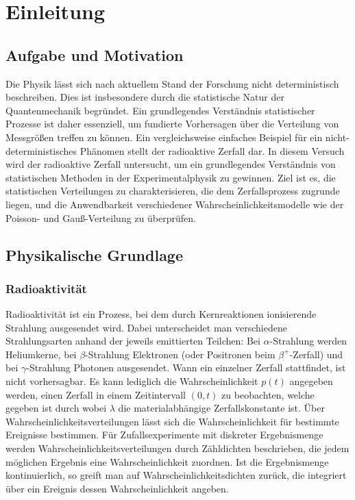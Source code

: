\chapter{Einleitung} \label{ch:Einleitung}

\section{Aufgabe und Motivation}
\label{sec:AuM}

Die Physik lässt sich nach aktuellem Stand der Forschung nicht deterministisch beschreiben. Dies ist insbesondere durch die statistische Natur der Quantenmechanik begründet. Ein grundlegendes Verständnis statistischer Prozesse ist daher essenziell, um fundierte Vorhersagen über die Verteilung von Messgrößen treffen zu können. Ein vergleichsweise einfaches Beispiel für ein nicht-deterministisches Phänomen stellt der radioaktive Zerfall dar.
In diesem Versuch wird der radioaktive Zerfall untersucht, um ein grundlegendes Verständnis von statistischen Methoden in der Experimentalphysik zu gewinnen. Ziel ist es, die statistischen Verteilungen zu charakterisieren, die dem Zerfallsprozess zugrunde liegen, und die Anwendbarkeit verschiedener Wahrscheinlichkeitsmodelle wie der Poisson- und Gauß-Verteilung zu überprüfen.

\section{Physikalische Grundlage}
\label{sec:PhyBasics}
\subsection{Radioaktivität}
Radioaktivität ist ein Prozess, bei dem durch Kernreaktionen ionisierende Strahlung ausgesendet wird. Dabei unterscheidet man verschiedene Strahlungsarten anhand der jeweils emittierten Teilchen: Bei $\alpha$-Strahlung werden Heliumkerne, bei $\beta$-Strahlung Elektronen (oder Positronen beim $\beta^+$-Zerfall) und bei $\gamma$-Strahlung Photonen ausgesendet. Wann ein einzelner Zerfall stattfindet, ist nicht vorhersagbar. Es kann lediglich die Wahrscheinlichkeit $p(t)$ angegeben werden, einen Zerfall in einem Zeitintervall $(0,t)$ zu beobachten, welche gegeben ist durch
wobei $\lambda$ die materialabhängige Zerfallskonstante ist.
Über Wahrscheinlichkeitsverteilungen lässt sich die Wahrscheinlichkeit für bestimmte Ereignisse bestimmen. Für Zufallsexperimente mit diskreter Ergebnismenge werden Wahrscheinlichkeitsverteilungen durch Zähldichten beschrieben, die jedem möglichen Ergebnis eine Wahrscheinlichkeit zuordnen. Ist die Ergebnismenge kontinuierlich, so greift man auf Wahrscheinlichkeitsdichten zurück, die integriert über ein Ereignis dessen Wahrscheinlichkeit angeben.

